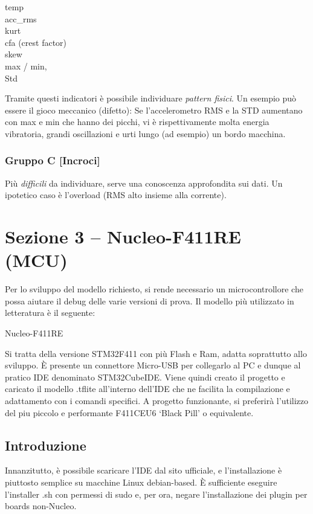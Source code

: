 temp\\
acc\_rms\\
kurt\\
cfa (crest factor)\\
skew\\
max / min,\\
Std

Tramite questi indicatori è possibile individuare \textit{pattern fisici}. Un esempio può essere il gioco meccanico (difetto): Se l’accelerometro RMS e la STD aumentano con max e min che hanno dei picchi, vi è rispettivamente molta energia vibratoria, grandi oscillazioni e urti lungo (ad esempio) un bordo macchina.

\subsubsection{Gruppo C [Incroci]}

Più \textit{difficili} da individuare, serve una conoscenza approfondita sui dati. Un ipotetico caso è l’overload (RMS alto insieme alla corrente).

\section{Sezione 3 -- Nucleo-F411RE (MCU)}

Per lo sviluppo del modello richiesto, si rende necessario un microcontrollore che possa aiutare il debug delle varie versioni di prova. Il modello più utilizzato in letteratura è il seguente:
\begin{center}
    Nucleo-F411RE
\end{center}
Si tratta della versione STM32F411 con più Flash e Ram, adatta soprattutto allo sviluppo. È presente un connettore Micro-USB per collegarlo al PC e dunque al pratico IDE denominato STM32CubeIDE. Viene quindi creato il progetto e caricato il modello .tflite all’interno dell’IDE che ne facilita la compilazione e adattamento con i comandi specifici. A progetto funzionante, si preferirà l’utilizzo del piu piccolo e performante F411CEU6 ‘Black Pill’ o equivalente.

\subsection{Introduzione}

Innanzitutto, è possibile scaricare l'IDE dal sito ufficiale, e l'installazione è piuttosto semplice su macchine Linux debian-based. È sufficiente eseguire l'installer .sh con permessi di sudo e, per ora, negare l'installazione dei plugin per boards non-Nucleo.

